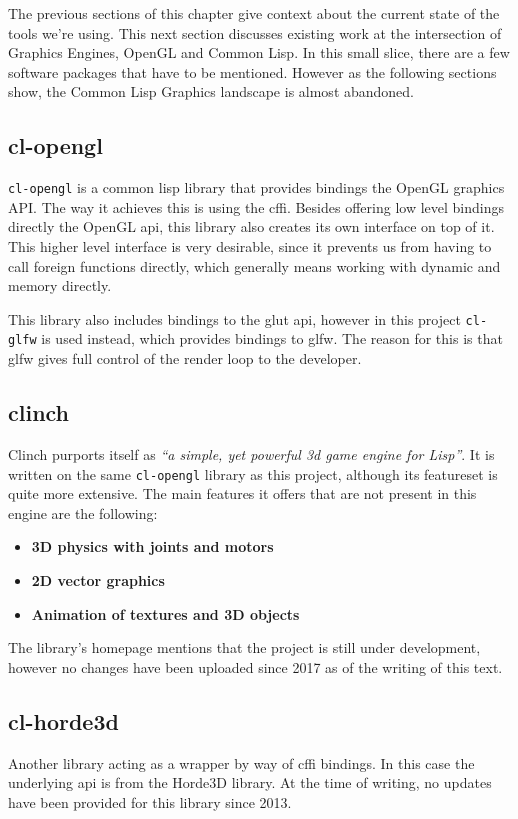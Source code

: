 The previous sections of this chapter give context about the current state of the tools we're using.
This next section discusses existing work at the intersection of Graphics Engines, OpenGL and Common Lisp.
In this small slice,
there are a few software packages that have to be mentioned.
However as the following sections show,
the Common Lisp Graphics landscape is almost abandoned.

\subsection{cl-opengl}

\texttt{cl-opengl} is a common lisp library that provides bindings the OpenGL graphics API.
The way it achieves this is using the \ac{cffi}.
Besides offering low level bindings directly the OpenGL \ac{api},
this library also creates its own interface on top of it.
This higher level interface is very desirable,
since it prevents us from having to call foreign functions directly,
which generally means working with dynamic and memory directly\cite{cffi}.

This library also includes bindings to the \ac{glut} \ac{api},
however in this project \texttt{cl-glfw} is used instead,
which provides bindings to \ac{glfw}.
The reason for this is that \ac{glfw} gives full control of the render loop to the developer.

\subsection{clinch}

Clinch purports itself as \textit{``a simple, yet powerful 3d game engine for Lisp''}. It is written on the same \texttt{cl-opengl} library as this project, although its feature\-set is quite more extensive. The main features it offers that are not present in this engine are the following\cite{clinch}:

\begin{itemize}
\item \textbf{3D physics with joints and motors}
\item \textbf{2D vector graphics}
\item \textbf{Animation of textures and 3D objects}
\end{itemize}

The library's homepage mentions that the project is still under development,
however no changes have been uploaded since 2017 as of the writing of this text.

\subsection{cl-horde3d}

Another library acting as a wrapper by way of \ac{cffi} bindings.
In this case the underlying \ac{api} is from the Horde3D library\cite{horde3d}.
At the time of writing,
no updates have been provided for this library since 2013.

